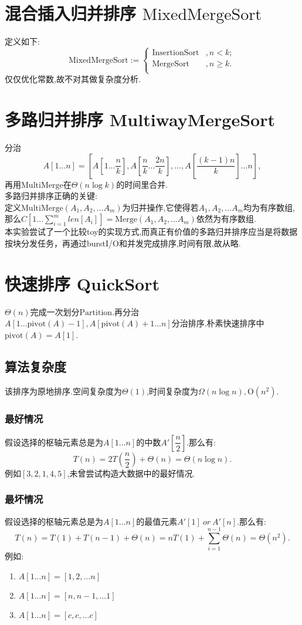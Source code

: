 \documentclass[UTF8]{ctexart}
\newcommand{\ds}{\displaystyle}
\newcommand{\gro}{\mathrm{O}}
\begin{document}
\section{混合插入归并排序 $\mathrm{MixedMergeSort}$}
定义如下:
$$
    \mathrm{MixedMergeSort}:=\left\{
    \begin{array}{ll}
        \mathrm{InsertionSort} & ,n < k;\\
        \mathrm{MergeSort} & ,n \geqslant k.\\
    \end{array}
    \right.
$$
仅仅优化常数,故不对其做复杂度分析.
\section{多路归并排序 MultiwayMergeSort}
分治
$$
A[1...n]=[A[1...\dfrac{n}{k}],A[\dfrac{n}{k}...\dfrac{2n}{k}],..., A[\dfrac{(k-1)n}{k}]...n],$$
再用$\mathrm{MultiMerge}$在$\Theta(n\log k)$的时间里合并.\\
\indent
多路归并排序正确的关键:\\
\indent
定义$\mathrm{MultiMerge}(A_1,A_2,...A_m)$为归并操作,它使得若$A_1,A_2,...A_m$均为有序数组,那么$\ds C[1...\sum_{i=1}^m len[A_i]]=\mathrm{Merge}(A_1,A_2,...A_m)$依然为有序数组.\\
本实验尝试了一个比较toy的实现方式,而真正有价值的多路归并排序应当是将数据按块分发任务，再通过burstI/O和并发完成排序,时间有限,故从略.

\newpage
\section{快速排序 QuickSort}
$\Theta(n)$完成一次划分$\mathrm{Partition}$.再分治$A[1...\mathrm{pivot}(A)-1],A[\mathrm{pivot}(A)+1...n]$分治排序.朴素快速排序中$\mathrm{pivot}(A)=A[1]$.
\subsection{算法复杂度}
该排序为原地排序.空间复杂度为$\Theta(1)$,时间复杂度为$\Omega(n\log n), \gro(n^2)$.
\subsubsection{最好情况}
假设选择的枢轴元素总是为$A[1...n]$的中数$A'[\dfrac{n}{2}]$.那么有:
$$
T(n)=2T(\frac{n}{2}) + \Theta(n)=\Theta(n\log n).
$$
例如$[3,2,1,4,5]$,未曾尝试构造大数据中的最好情况.
\subsubsection{最坏情况}
假设选择的枢轴元素总是为$A[1...n]$的最值元素$A'[1]\ or\ A'[n]$.那么有:
$$
T(n) = T(1) + T(n-1) +\Theta(n)=nT(1) + \sum_{i=1}^{n-1}\Theta(n) = \Theta(n^2).
$$
例如:
\begin{enumerate}[1.]
\item    $A[1...n] = [1,2,...n]$
\item    $A[1...n] = [n,n-1,...1]$
\item    $A[1...n] = [c,c,...c]$
\end{enumerate}
\end{document}

